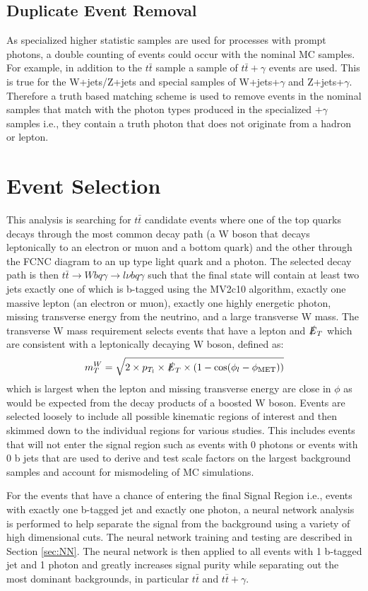 \subsection{Duplicate Event Removal}
As specialized higher statistic samples are used for processes with prompt photons, a double counting of events could occur with the nominal MC samples.  For example, in addition to the $t\bar{t}$ sample a sample of $t\bar{t}+\gamma$ events are used.  This is true for the W+jets/Z+jets and special samples of W+jets+$\gamma$ and Z+jets+$\gamma$.  Therefore a truth based matching scheme is used to remove events in the nominal samples that match with the photon types produced in the specialized $+\gamma$ samples i.e., they contain a truth photon that does not originate from a hadron or lepton.

\section{Event Selection}
This analysis is searching for $t\bar{t}$ candidate events where one of the top quarks decays through the most common decay path (a W boson that decays leptonically to an electron or muon and a bottom quark) and the other through the FCNC diagram to an up type light quark and a photon.  The selected decay path is then $t\bar{t} \rightarrow Wbq\gamma \rightarrow l\nu b q \gamma$ such that the final state will contain at least two jets exactly one of which is b-tagged using the MV2c10 algorithm, exactly one massive lepton (an electron or muon), exactly one highly energetic photon, missing transverse energy from the neutrino, and a large transverse W mass.  The transverse W mass requirement selects events that have a lepton and $\slashed{E}_T$ which are consistent with a leptonically decaying W boson, defined as:
\[ m_T^{W} =  \sqrt{2\times p_{T_l}\times \slashed{E}_T \times (1 - \text{cos}(\phi_l -\phi_{\text{MET}}))}\]
which is largest when the lepton and missing transverse energy are close in $\phi$ as would be expected from the decay products of a boosted W boson.  Events are selected loosely to include all possible kinematic regions of interest and then skimmed down to the individual regions for various studies.  This includes events that will not enter the signal region such as events with 0 photons or events with 0 b jets that are used to derive and test scale factors on the largest background samples and account for mismodeling of MC simulations. 

For the events that have a chance of entering the final Signal Region i.e., events with exactly one b-tagged jet and exactly one photon, a neural network analysis is performed to help separate the signal from the background using a variety of high dimensional cuts.  The neural network training and testing are described in Section \ref{sec:NN}.  The neural network is then applied to all events with 1 b-tagged jet and 1 photon and greatly increases signal purity while separating out the most dominant backgrounds, in particular $t\bar{t}$ and $t\bar{t}+\gamma$.




